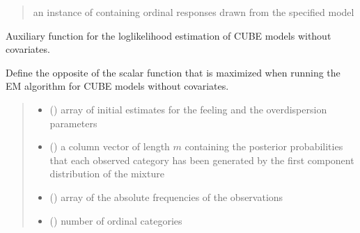 \documentclass[letterpaper,10pt,english]{sphinxmanual}
\begin{document}
\begin{fulllineitems}
\begin{quote}
\begin{description}
\begin{itemize}
\end{itemize}

\sphinxAtStartPar
an instance of  containing ordinal responses drawn from the specified model

\end{description}\end{quote}

\end{fulllineitems}


\begin{fulllineitems}
\label{\detokenize{cubmods:cubmods.cube.effecube}}
\pysigstartsignatures
{}
\pysigstopsignatures
\sphinxAtStartPar
Auxiliary function for the log\sphinxhyphen{}likelihood estimation of CUBE models without covariates.

\sphinxAtStartPar
Define the opposite of the scalar function that is maximized when running the E\sphinxhyphen{}M 
algorithm for CUBE models without covariates.
\begin{quote}\begin{description}
\begin{itemize}
\item {} 
\sphinxAtStartPar
{} () \textendash{} array of initial estimates for the feeling and the overdispersion parameters

\item {} 
\sphinxAtStartPar
{} () \textendash{} a column vector of length \(m\) containing the posterior
probabilities that each observed category has been generated by the first component distribution 
of the mixture

\item {} 
\sphinxAtStartPar
{} () \textendash{} array of the absolute frequencies of the observations

\item {} 
\sphinxAtStartPar
{} () \textendash{} number of ordinal categories


\end{itemize}
\end{description}
\end{quote}
\end{fulllineitems}
\end{document}
